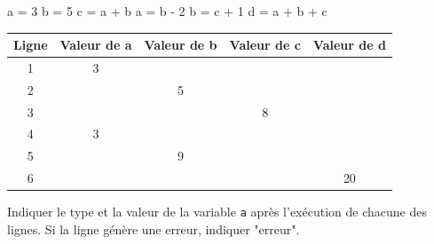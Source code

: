 \documentclass[a4paper,10pt]{report}
\def\ptsexoC{3}
\begin{document}
\begin{minipage}{0.29\linewidth}

\begin{CodePythontexAlt}[TaillePolice=\large,Largeur=1\linewidth,Centre,PremLigne=1]{}
a = 3
b = 5
c = a + b
a = b - 2
b = c + 1
d = a + b + c
\end{CodePythontexAlt}

\end{minipage}\hfill
\begin{minipage}{0.66\linewidth}
    
    \medskip

    \begin{tabular}{|c|c|c|c|c|}
        \hline
        Ligne& Valeur de a & Valeur de b &Valeur de c & Valeur de d\\ \hline
        1&3&&&\\\hline
        2&&5&&\\\hline
        3&&&8&\\\hline
        4&3&&&\\\hline
        5&&9&&\\\hline
        6&&&&20\\\hline


    \end{tabular}
\end{minipage}

\bigskip

\exods{\ptsexoC}

Indiquer le type et la valeur de la variable \verb|a| après l'exécution de chacune des lignes. Si la ligne génère une erreur, indiquer "erreur".
\end{document}
